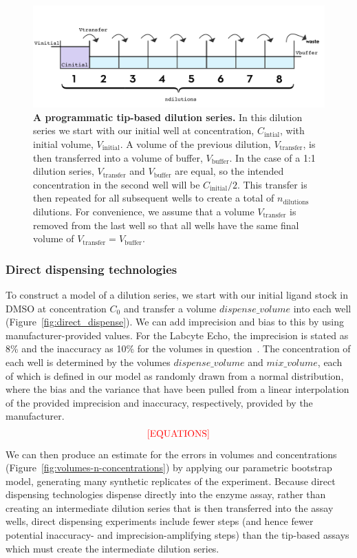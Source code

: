 \documentclass[aps,pre,twocolumn,nofootinbib,superscriptaddress,linenumbers]{revtex4-1}
\begin{document}
\begin{figure}[tb]
    \includegraphics[width=\columnwidth]{../figures/dilution.pdf}

  \caption{{\bf A programmatic tip-based dilution series.}
  In this dilution series we start with our initial well at concentration, $C_\mathrm{intial}$, with initial volume, $V_\mathrm{initial}$. 
  A volume of the previous dilution, $V_\mathrm{transfer}$, is then transferred into a volume of buffer, $V_\mathrm{buffer}$. 
  In the case of a 1:1 dilution series, $V_\mathrm{transfer}$ and $V_\mathrm{buffer}$ are equal, so the intended concentration in the second well will be $C_\mathrm{initial}/2$. 
  This transfer is then repeated for all subsequent wells to create a total of $n_\mathrm{dilutions}$ dilutions. 
  For convenience, we assume that a volume $V_\mathrm{transfer}$ is removed from the last well so that all wells have the same final volume of $V_\mathrm{transfer} = V_\mathrm{buffer}$.
  }
  \label{fig:dilution}
\end{figure}

\subsubsection*{Direct dispensing technologies}

To construct a model of a dilution series, we start with our initial ligand stock in DMSO at concentration $C_0$ and transfer a volume $dispense\_volume$ into each well (Figure~\ref{fig:direct_dispense}). 
We can add imprecision and bias to this by using manufacturer-provided values.
For the Labcyte Echo, the imprecision is stated as 8\% and the inaccuracy as 10\% for the volumes in question~\cite{_echo_2011}. 
The concentration of each well is determined by the volumes $dispense\_volume$ and $mix\_volume$, each of which is defined in our model as randomly drawn from a normal distribution, where the bias and the variance that have been pulled from a linear interpolation of the provided imprecision and inaccuracy, respectively, provided by the manufacturer.
\begin{eqnarray}
\color{red}
\mathrm{[EQUATIONS]}
\end{eqnarray}
We can then produce an estimate for the errors in volumes and concentrations (Figure~\ref{fig:volumes-n-concentrations}) by applying our parametric bootstrap model, generating many synthetic replicates of the experiment.
Because direct dispensing technologies dispense directly into the enzyme assay, rather than creating an intermediate dilution series that is then transferred into the assay wells, direct dispensing experiments include fewer steps (and hence fewer potential inaccuracy- and imprecision-amplifying steps) than the tip-based assays which must create the intermediate dilution series.
\end{document}
